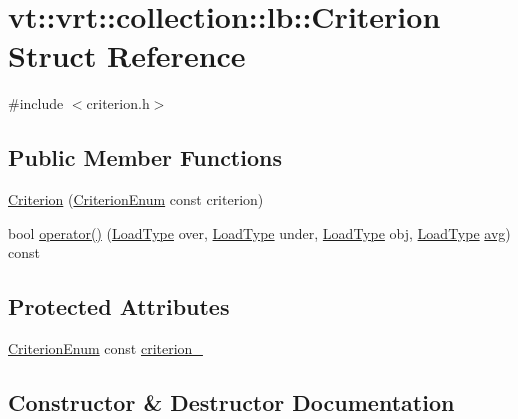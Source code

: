 \hypertarget{structvt_1_1vrt_1_1collection_1_1lb_1_1_criterion}{}\section{vt\+:\+:vrt\+:\+:collection\+:\+:lb\+:\+:Criterion Struct Reference}
\label{structvt_1_1vrt_1_1collection_1_1lb_1_1_criterion}


{\ttfamily \#include $<$criterion.\+h$>$}

\subsection*{Public Member Functions}
\begin{DoxyCompactItemize}
\item 
\hyperlink{structvt_1_1vrt_1_1collection_1_1lb_1_1_criterion_a05ee5b1e640c221b321a2a4bd7f3c5ba}{Criterion} (\hyperlink{namespacevt_1_1vrt_1_1collection_1_1lb_a4e454750e102cf5404d5ac151148951c}{Criterion\+Enum} const criterion)
\item 
bool \hyperlink{structvt_1_1vrt_1_1collection_1_1lb_1_1_criterion_a0e00fffc188ecbc09008fe84afb60643}{operator()} (\hyperlink{namespacevt_a8fb51741340b87d7aaee0bef60e9896b}{Load\+Type} over, \hyperlink{namespacevt_a8fb51741340b87d7aaee0bef60e9896b}{Load\+Type} under, \hyperlink{namespacevt_a8fb51741340b87d7aaee0bef60e9896b}{Load\+Type} obj, \hyperlink{namespacevt_a8fb51741340b87d7aaee0bef60e9896b}{Load\+Type} \hyperlink{namespacevt_1_1vrt_1_1collection_1_1lb_a74989c7b4dd16fcc067e90a29cd1febeae322d423f075b0ab2daad27011d24909}{avg}) const
\end{DoxyCompactItemize}
\subsection*{Protected Attributes}
\begin{DoxyCompactItemize}
\item 
\hyperlink{namespacevt_1_1vrt_1_1collection_1_1lb_a4e454750e102cf5404d5ac151148951c}{Criterion\+Enum} const \hyperlink{structvt_1_1vrt_1_1collection_1_1lb_1_1_criterion_abec00c435938c265ec0b3e3d984c09a6}{criterion\+\_\+}
\end{DoxyCompactItemize}


\subsection{Constructor \& Destructor Documentation}
\mbox{\label{structvt_1_1vrt_1_1collection_1_1lb_1_1_criterion_a05ee5b1e640c221b321a2a4bd7f3c5ba}} 
